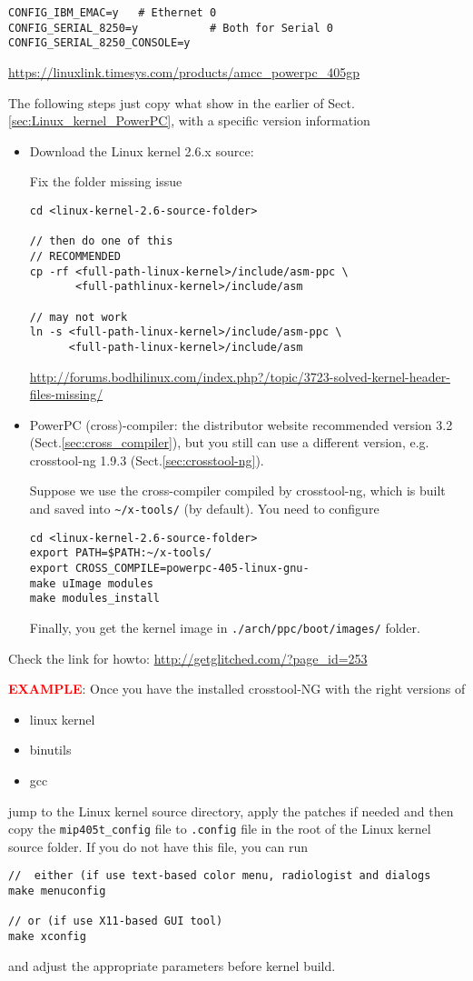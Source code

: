 \begin{verbatim}
CONFIG_IBM_EMAC=y   # Ethernet 0
CONFIG_SERIAL_8250=y           # Both for Serial 0
CONFIG_SERIAL_8250_CONSOLE=y   
\end{verbatim}
\url{https://linuxlink.timesys.com/products/amcc_powerpc_405gp}

The following steps just copy what show in the earlier of
Sect.\ref{sec:Linux_kernel_PowerPC}, with a specific version information
\begin{itemize}
  \item Download the Linux kernel 2.6.x source: 

Fix the folder missing issue 
\begin{verbatim}
cd <linux-kernel-2.6-source-folder>

// then do one of this
// RECOMMENDED
cp -rf <full-path-linux-kernel>/include/asm-ppc \ 
       <full-pathlinux-kernel>/include/asm

// may not work
ln -s <full-path-linux-kernel>/include/asm-ppc \
      <full-path-linux-kernel>/include/asm
\end{verbatim}   
\url{http://forums.bodhilinux.com/index.php?/topic/3723-solved-kernel-header-files-missing/}

  \item PowerPC (cross)-compiler: the distributor website recommended version
  3.2 (Sect.\ref{sec:cross_compiler}),
  but you still can use a different version, e.g. crosstool-ng 1.9.3
  (Sect.\ref{sec:crosstool-ng}).
  
Suppose we use the cross-compiler compiled by crosstool-ng, which is built and
saved into \verb!~/x-tools/! (by default).
You need to configure
\begin{verbatim}
cd <linux-kernel-2.6-source-folder>
export PATH=$PATH:~/x-tools/
export CROSS_COMPILE=powerpc-405-linux-gnu-
make uImage modules 
make modules_install
\end{verbatim}

Finally, you get the kernel image in 
\verb!./arch/ppc/boot/images/! folder.
    
\end{itemize}

Check the link for howto:
\url{http://getglitched.com/?page_id=253}


\textcolor{red}{\bf EXAMPLE}:
Once you have the installed crosstool-NG with the right versions of 
\begin{itemize}
  \item linux kernel
  \item binutils
  \item gcc
\end{itemize}
jump to the Linux kernel source directory, apply the patches if needed
and then copy the \verb!mip405t_config! file to 
\verb!.config! file in the root of the Linux kernel source folder.
If you do not have this file, you can run
\begin{verbatim}
//  either (if use text-based color menu, radiologist and dialogs
make menuconfig

// or (if use X11-based GUI tool)
make xconfig
\end{verbatim}
and adjust the appropriate parameters before kernel build.

